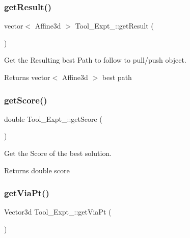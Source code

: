 \subsubsection{\texorpdfstring{get\+Result()}{getResult()}}
{\footnotesize\ttfamily vector$<$ Affine3d $>$ Tool\+\_\+\+Expt\+\_\+::get\+Result (\begin{DoxyParamCaption}{ }\end{DoxyParamCaption})\hspace{0.3cm}{\ttfamily [inline]}}



Get the Resulting best Path to follow to pull/push object. 

\begin{DoxyReturn}{Returns}
vector$<$ Affine3d $>$ best path 
\end{DoxyReturn}
\mbox{\label{classTool__Expt__2_a914a228608477de677f9045fe6bf3c08}} 
\subsubsection{\texorpdfstring{get\+Score()}{getScore()}}
{\footnotesize\ttfamily double Tool\+\_\+\+Expt\+\_\+::get\+Score (\begin{DoxyParamCaption}{ }\end{DoxyParamCaption})\hspace{0.3cm}{\ttfamily [inline]}}



Get the Score of the best solution. 

\begin{DoxyReturn}{Returns}
double score 
\end{DoxyReturn}
\mbox{\label{classTool__Expt__2_a9247b27356d4972cdb911120cc1920cb}} 
\subsubsection{\texorpdfstring{get\+Via\+Pt()}{getViaPt()}}
{\footnotesize\ttfamily Vector3d Tool\+\_\+\+Expt\+\_\+::get\+Via\+Pt (\begin{DoxyParamCaption}{ }\end{DoxyParamCaption})\hspace{0.3cm}{\ttfamily [inline]}}



